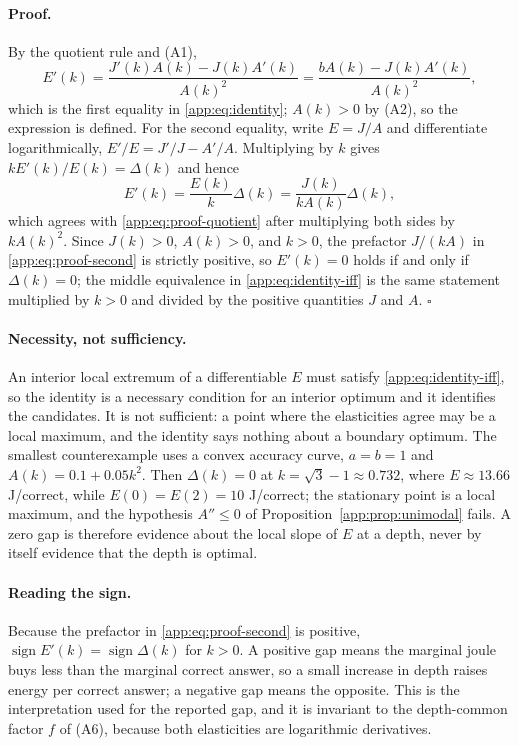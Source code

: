 \paragraph{Proof.} By the quotient rule and (A1),
\begin{equation}\label{app:eq:proof-quotient}
  E'(k)=\frac{J'(k)A(k)-J(k)A'(k)}{A(k)^{2}}
  =\frac{bA(k)-J(k)A'(k)}{A(k)^{2}},
\end{equation}
which is the first equality in \eqref{app:eq:identity}; $A(k)>0$ by (A2), so the
expression is defined. For the second equality, write
$E=J/A$ and differentiate logarithmically, $E'/E=J'/J-A'/A$. Multiplying by $k$
gives $kE'(k)/E(k)=\Delta(k)$ and hence
\begin{equation}\label{app:eq:proof-second}
  E'(k)=\frac{E(k)}{k}\Delta(k)=\frac{J(k)}{kA(k)}\Delta(k),
\end{equation}
which agrees with \eqref{app:eq:proof-quotient} after multiplying both sides by
$kA(k)^{2}$. Since $J(k)>0$, $A(k)>0$, and $k>0$, the prefactor $J/(kA)$ in
\eqref{app:eq:proof-second} is strictly positive, so $E'(k)=0$ holds if and only
if $\Delta(k)=0$; the middle equivalence in \eqref{app:eq:identity-iff} is the
same statement multiplied by $k>0$ and divided by the positive quantities $J$
and $A$. \hfill$\square$

\paragraph{Necessity, not sufficiency.} An interior local extremum of a
differentiable $E$ must satisfy \eqref{app:eq:identity-iff}, so the identity is a
necessary condition for an interior optimum and it identifies the candidates.
It is not sufficient: a point where the elasticities agree may be a local
maximum, and the identity says nothing about a boundary optimum. The smallest
counterexample uses a convex accuracy curve, $a=b=1$ and
$A(k)=0.1+0.05k^{2}$. Then $\Delta(k)=0$ at $k=\sqrt{3}-1\approx0.732$, where
$E\approx13.66$ J/correct, while $E(0)=E(2)=10$ J/correct; the stationary point
is a local maximum, and the hypothesis $A''\le0$ of Proposition~\ref{app:prop:unimodal}
fails. A zero gap is therefore evidence about the local slope of $E$ at a depth,
never by itself evidence that the depth is optimal.

\paragraph{Reading the sign.} Because the prefactor in \eqref{app:eq:proof-second}
is positive, $\operatorname{sign}E'(k)=\operatorname{sign}\Delta(k)$ for $k>0$. A
positive gap means the marginal joule buys less than the marginal correct answer,
so a small increase in depth raises energy per correct answer; a negative gap
means the opposite. This is the interpretation used for the reported gap, and it
is invariant to the depth-common factor $f$ of (A6), because both elasticities
are logarithmic derivatives.

